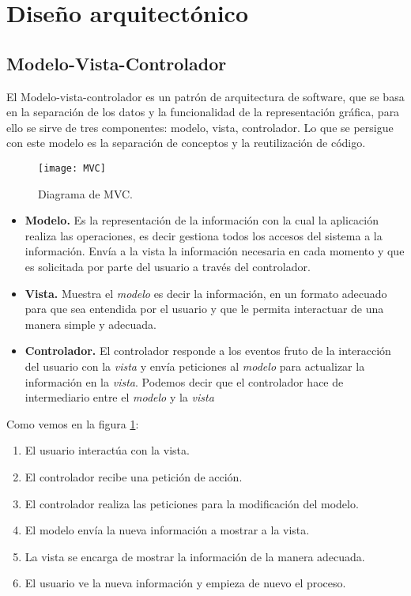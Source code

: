 \section{Diseño arquitectónico}
\subsection{Modelo-Vista-Controlador}

El Modelo-vista-controlador es un patrón de arquitectura de software, que se basa en la separación de los datos y la funcionalidad de la representación gráfica, para ello se sirve de tres componentes: modelo, vista, controlador. Lo que se persigue con este modelo es la separación de conceptos y la reutilización de código.
\begin{figure}[H]
	\centering
	\texttt{[image: MVC]}
	\caption{Diagrama de MVC.}
	\label{fig:MVC}
\end{figure}
\begin{itemize}
	\item \textbf{Modelo.} Es la representación de la información con la cual la aplicación realiza las operaciones, es decir gestiona todos los accesos del sistema a la información. Envía a la vista la información necesaria en cada momento y que es solicitada por parte del usuario a través del controlador.
	\item \textbf{Vista.} Muestra el \emph{modelo} es decir la información, en un formato adecuado para que sea entendida por el usuario y que le permita interactuar de una manera simple y adecuada.
	\item \textbf{Controlador.} El controlador responde a los eventos fruto de la interacción del usuario con la \emph{vista} y envía peticiones al \emph{modelo} para actualizar la información en la \emph{vista}. Podemos decir que el controlador hace de intermediario entre el \emph{modelo} y la \emph{vista}
\end{itemize}

Como vemos en la figura \ref{fig:MVC}:
\begin{enumerate}
	\item El usuario interactúa con la vista.
	\item El controlador recibe una petición de acción.
	\item El controlador realiza las peticiones para la modificación del modelo.
	\item El modelo envía la nueva información a mostrar a la vista.
	\item La vista se encarga de mostrar la información de la manera adecuada.
	\item El usuario ve la nueva información y empieza de nuevo el proceso.
\end{enumerate}
